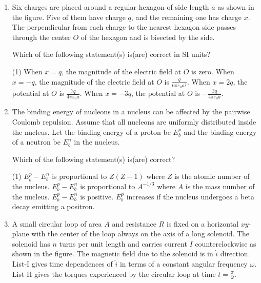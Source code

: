 \documentclass{article}
\begin{document}
\begin{enumerate}
    \item Six charges are placed around a regular hexagon of side length $a$ as shown in the figure. Five of them have charge $q$, and the remaining one has charge $x$. The perpendicular from each charge to the nearest hexagon side passes through the center $O$ of the hexagon and is bisected by the side.
    \begin{center}
    \end{center} 
    Which of the following statement(s) is(are) correct in SI units?
        \begin{tasks}(1)
            	\task When $x = q$, the magnitude of the electric field at $O$ is zero.
            	\task When $x = -q$, the magnitude of the electric field at $O$ is $\frac{q}{6\pi \varepsilon_0 a^2}$.
            	\task When $x = 2q$, the potential at $O$ is $\frac{7q}{4\pi\varepsilon_0 a}$.
            	\task When $x = -3q$, the potential at $O$ is $-\frac{3q}{4\pi\varepsilon_0 a}$.
        \end{tasks}

    \item The binding energy of nucleons in a nucleus can be affected by the pairwise Coulomb repulsion. Assume that all nucleons are uniformly distributed inside the nucleus. Let the binding energy of a proton be $E_b^p$ and the binding energy of a neutron be $E_b^n$ in the nucleus.
    
    Which of the following statement(s) is(are) correct?
        \begin{tasks}(1)
            	\task $E_b^p - E_b^n$ is proportional to $Z(Z - 1)$ where $Z$ is the atomic number of the nucleus.
            	\task $E_b^p - E_b^n$ is proportional to $A^{-1/3}$ where $A$ is the mass number of the nucleus.
            	\task $E_b^p - E_b^n$ is positive.
            	\task $E_b^p$ increases if the nucleus undergoes a beta decay emitting a positron.
        \end{tasks}

  \item A small circular loop of area $A$ and resistance $R$ is fixed on a horizontal $xy$-plane with the center of the loop always on the axis of a long solenoid. The solenoid has $n$ turns per unit length and carries current $I$ counterclockwise as shown in the figure. The magnetic field due to the solenoid is in $\hat{i}$ direction. List-I gives time dependences of $\hat{i}$ in terms of a constant angular frequency $\omega$. List-II gives the torques experienced by the circular loop at time $t = \frac{\pi}{\omega}$.


\end{enumerate}
\end{document}
